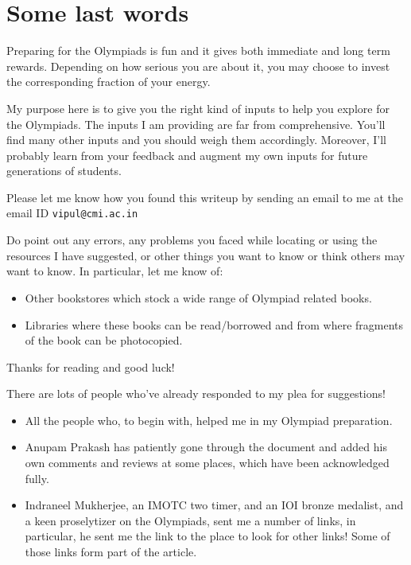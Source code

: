\documentclass[a4paper]{amsart}
\begin{document}
\section{Some last words}

Preparing for the Olympiads is fun and it gives both immediate and long term rewards. Depending on how serious you are about it,
you may choose to invest the corresponding fraction of your energy.

My purpose here is to give you the right kind of inputs to help you explore for the Olympiads. The inputs I am providing are far from
comprehensive. You'll find many other inputs and you should weigh them accordingly. Moreover, I'll probably learn from your feedback
and augment my own inputs for future generations of students.

Please let me know how you found this writeup by sending an email to me at the email ID {\tt vipul@cmi.ac.in}

Do point out any errors, any problems you faced while locating or using the resources I have suggested, or other things you want
to know or think others may want to know. In particular, let me know of:

\begin{itemize}

\item Other bookstores which stock a wide range of Olympiad
  related books.

\item Libraries where these books can be read/borrowed and from where
  fragments of the book can be photocopied.

\end{itemize}

Thanks for reading and good luck!

\appendix

There are lots of people who've already responded to my plea for suggestions!

\begin{itemize}

\item All the people who, to begin with, helped me in my Olympiad preparation.

\item Anupam Prakash has patiently gone through the document and added his own comments and reviews at some places, which have been
  acknowledged fully.

\item Indraneel Mukherjee, an IMOTC two timer, and an
  IOI bronze medalist, and a keen proselytizer on the Olympiads, sent me a number
  of links, in particular, he sent me the link to the place to look for other links! Some of those links form part of the article.

\end{itemize}
\end{document}

